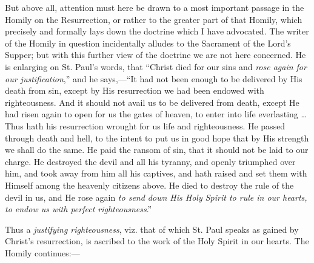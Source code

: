 But above all, attention must here be drawn to a most important
passage in the Homily on the Resurrection, or rather to the greater
part of that Homily, which precisely and formally lays down the
doctrine which I have advocated. The writer of the Homily in question
incidentally alludes to the Sacrament of the Lord's Supper; but with
this further view of the doctrine we are not here concerned. He is
enlarging on St. Paul's words, that ``Christ died for our sins and
\emph{rose again for our justification},'' and he says,—``It
had not been enough to be delivered by His death from sin, except by
His resurrection we had been endowed with righteousness. And it should
not avail us to be delivered from death, except He had risen again to
open for us the gates of heaven, to enter into life everlasting …
Thus hath his resurrection wrought for us life and righteousness. He
passed through death and hell, to the intent to put us in good hope
that by His strength we shall do the same. He paid the ransom of sin,
that it should not be laid to our charge. He destroyed the devil and
all his tyranny, and openly triumphed over him, and took away from him
all his captives, and hath raised and set them with Himself among
the heavenly citizens above. He died to destroy the rule of the
devil in us, and He rose again \emph{to send down His Holy Spirit to rule
in our hearts, to endow us with perfect righteousness}.''

Thus a \emph{justifying righteousness}, viz. that of which St. Paul
speaks as gained by Christ's resurrection, is ascribed to the work of
the Holy Spirit in our hearts. The Homily continues:—

